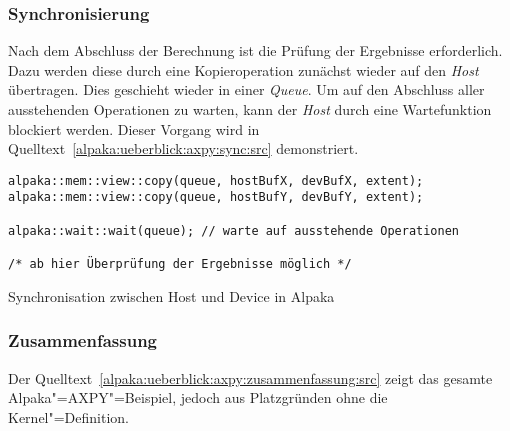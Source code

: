 \subsubsection{Synchronisierung}
\label{alpaka:ueberblick:axpy:sync}

Nach dem Abschluss der Berechnung ist die Prüfung der Ergebnisse erforderlich.
Dazu werden diese durch eine Kopieroperation zunächst wieder auf den
\textit{Host} übertragen. Dies geschieht wieder in einer \textit{Queue}. Um
auf den Abschluss aller ausstehenden Operationen zu warten, kann der
\textit{Host} durch eine Wartefunktion blockiert werden. Dieser Vorgang wird in
Quelltext~\ref{alpaka:ueberblick:axpy:sync:src} demonstriert.

\begin{code}
    \begin{verbatim}
alpaka::mem::view::copy(queue, hostBufX, devBufX, extent);
alpaka::mem::view::copy(queue, hostBufY, devBufY, extent);

alpaka::wait::wait(queue); // warte auf ausstehende Operationen

/* ab hier Überprüfung der Ergebnisse möglich */
    \end{verbatim}
    \caption{Synchronisation zwischen Host und Device in Alpaka}
    \label{alpaka:ueberblick:axpy:sync:src}
\end{code}

\subsubsection{Zusammenfassung}
\label{alpaka:ueberblick:axpy:zusammenfassung}

Der Quelltext~\ref{alpaka:ueberblick:axpy:zusammenfassung:src} zeigt das gesamte
Alpaka"=AXPY"=Beispiel, jedoch aus Platzgründen ohne die Kernel"=Definition.

